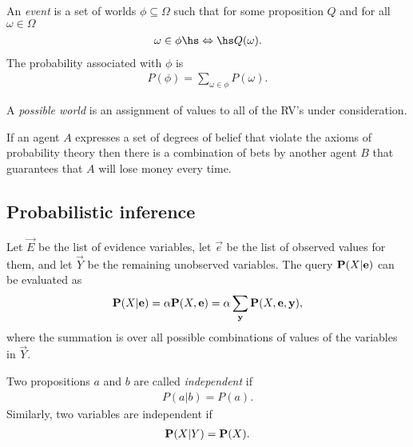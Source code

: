\documentclass{article}
\begin{document}
\begin{definition}
    An \emph{event} is a set of worlds $\phi\subseteq \Omega$ such that
    for some proposition $Q$ and for all $\omega\in\Omega$
    \begin{align*}
        \omega\in \phi\hs\Leftrightarrow\hs Q(\omega).
    \end{align*}
    The probability associated with $\phi$ is
    \begin{align*}
        P(\phi)=\sum_{\omega\in\phi} P(\omega).
    \end{align*}
\end{definition}

\begin{definition}
    A \emph{possible world} is an assignment of values to all of the RV's
    under consideration.
\end{definition}

\begin{theorem}[De Finetti]
    If an agent $A$ expresses a set of degrees of belief that violate
    the axioms of probability theory then there is a combination of
    bets by another agent $B$ that guarantees that $A$ will lose money
    every time. 
\end{theorem}

\subsection{Probabilistic inference}

\begin{lemma}[R\&N p. 493]
    Let $\vec E$ be the list of evidence variables, let $\vec e$ be the list of observed
    values for them, and let $\vec Y$ be the remaining unobserved variables. The query
    $\P(X|\vec e)$ can be evaluated as
    \begin{align*}
        \P(X|\vec e) = \alpha\P(X, \vec e) = \alpha \sum_{\vec y} \P(X,\vec e, \vec y),
    \end{align*}
    where the summation is over all possible combinations of values of the variables in
    $\vec Y$.
\end{lemma}

\begin{definition}[R\&N p. 494]
    Two propositions $a$ and $b$ are called \emph{independent} if
    \begin{align*}
        P(a|b) = P(a).
    \end{align*}
    Similarly, two variables are independent if
    \begin{align*}
        \P(X|Y) = \P(X).
    \end{align*}
\end{definition}
\end{document}
